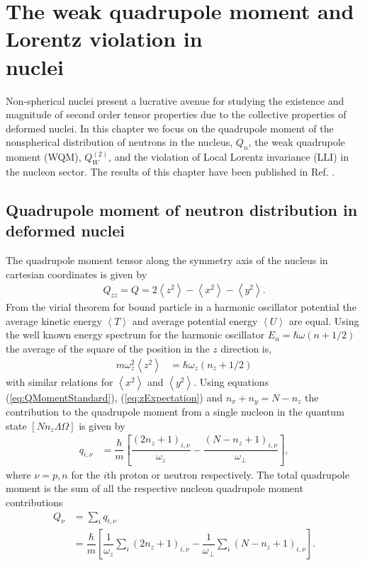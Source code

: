 \documentclass[10pt,a4paper, twoside, openright]{report}
\begin{document}
\chapter[The weak quadrupole moment and Lorentz violation in nuclei ]{The weak quadrupole moment and Lorentz violation in \\ nuclei} \label{chap:WQM}
Non-spherical nuclei present a lucrative avenue for studying the existence and magnitude of second order tensor properties due to the collective properties of deformed nuclei. In this chapter we focus on the quadrupole moment of the nonspherical  distribution of neutrons in the nucleus, $Q_{n}$,  the weak quadrupole moment (WQM), $Q_{W}^{(2)}$,  and the violation of Local Lorentz invariance (LLI) in the nucleon sector. The results of this chapter have been published in Ref. \cite{LFWQM2018}.

\section{Quadrupole moment of neutron distribution in deformed nuclei}
The quadrupole moment tensor along the symmetry axis of the nucleus in cartesian coordinates is given by
\begin{align}\label{eq:QMomentStandard}
Q_{zz} = Q = 2\left<z^2\right> - \left<x^2\right> - \left<y^2\right> .
\end{align}
From the virial theorem for bound particle in a harmonic oscillator potential the average kinetic energy $\left<T\right>$ and average potential energy $\left<U\right>$ are equal. Using the well known energy spectrum for the harmonic oscillator $E_{n} = \hbar\omega(n + 1/2)$  the average of the square of the position in the $z$ direction is,
\begin{align}\label{eq:zExpectation}
m\omega_z^2\left<z^2\right>&= \hbar\omega_z\left(n_z + 1/2\right) 
\end{align}
  with similar relations for $\left<x^2\right>$ and $\left<y^2\right>$. Using equations (\ref{eq:QMomentStandard}), (\ref{eq:zExpectation}) and $n_x + n_y = N - n_z$ the contribution to the quadrupole moment from a single nucleon in the quantum state $\left[N n_z \Lambda \Omega\right]$ is given by
\begin{align} \label{eq:QMomentNucleon}
q_{i,\nu} &= \dfrac{\hbar}{m}\left[\dfrac{\left(2n_z + 1\right)_{i,\nu}}{\omega_z} - \dfrac{\left(N -n_z + 1\right)_{i,\nu}}{\omega_{\perp}}\right] ,
\end{align}
where $\nu = p,n$ for the $i$th proton or neutron respectively. The total quadrupole moment is the sum of all the respective nucleon quadrupole moment contributions
\begin{align}
Q_{\nu} &= \sum_{i} q_{i,\nu} \nonumber\\
&= \dfrac{\hbar}{m}\left[\dfrac{1}{\omega_z}\sum_{i}\left(2n_z + 1\right)_{i,\nu} - \dfrac{1}{\omega_{\perp}}\sum_{i}\left(N -n_z + 1\right)_{i,\nu}\right]. \label{eq:CollectiveMDim} 
\end{align}
\end{document}

